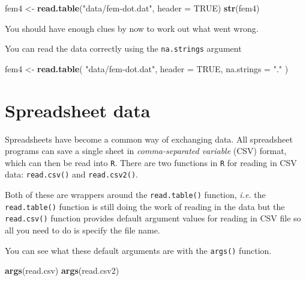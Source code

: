 \documentclass[
]{book}
\newenvironment{Shaded}{\begin{snugshade}}{\end{snugshade}}
\newcommand{\AttributeTok}[1]{\textcolor[rgb]{0.13,0.29,0.53}{#1}}
\newcommand{\ConstantTok}[1]{\textcolor[rgb]{0.56,0.35,0.01}{#1}}
\newcommand{\FunctionTok}[1]{\textcolor[rgb]{0.13,0.29,0.53}{\textbf{#1}}}
\newcommand{\NormalTok}[1]{#1}
\newcommand{\OtherTok}[1]{\textcolor[rgb]{0.56,0.35,0.01}{#1}}
\newcommand{\StringTok}[1]{\textcolor[rgb]{0.31,0.60,0.02}{#1}}
\begin{document}
\begin{Shaded}
\begin{Highlighting}[]
\NormalTok{fem4 }\OtherTok{\textless{}{-}} \FunctionTok{read.table}\NormalTok{(}\StringTok{"data/fem{-}dot.dat"}\NormalTok{, }\AttributeTok{header =} \ConstantTok{TRUE}\NormalTok{)}
\FunctionTok{str}\NormalTok{(fem4)}
\end{Highlighting}
\end{Shaded}

You should have enough clues by now to work out what went wrong.

You can read the data correctly using the \texttt{na.strings} argument

\begin{Shaded}
\begin{Highlighting}[]
\NormalTok{fem4 }\OtherTok{\textless{}{-}} 
  \FunctionTok{read.table}\NormalTok{(}
    \StringTok{"data/fem{-}dot.dat"}\NormalTok{, }
    \AttributeTok{header =} \ConstantTok{TRUE}\NormalTok{, }
    \AttributeTok{na.strings =} \StringTok{"."}
\NormalTok{  )}
\end{Highlighting}
\end{Shaded}

\section{Spreadsheet data}\label{spreadsheet-data}

Spreadsheets have become a common way of exchanging data. All
spreadsheet programs can save a single sheet in \emph{comma-separated
variable} (CSV) format, which can then be read into \texttt{R}. There
are two functions in \texttt{R} for reading in CSV data:
\texttt{read.csv()} and \texttt{read.csv2()}.

Both of these are wrappers around the \texttt{read.table()} function,
\emph{i.e.} the \texttt{read.table()} function is still doing the work
of reading in the data but the \texttt{read.csv()} function provides
default argument values for reading in CSV file so all you need to
do is specify the file name.

You can see what these default arguments are with the \texttt{args()}
function.

\begin{Shaded}
\begin{Highlighting}[]
\FunctionTok{args}\NormalTok{(read.csv)}
\FunctionTok{args}\NormalTok{(read.csv2)}
\end{Highlighting}
\end{Shaded}
\end{document}
